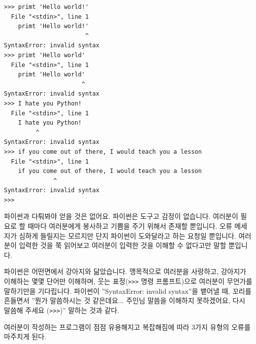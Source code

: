 \beforeverb
\begin{verbatim}
>>> primt 'Hello world!'
  File "<stdin>", line 1
    primt 'Hello world!'
                       ^
SyntaxError: invalid syntax
>>> primt 'Hello world'
  File "<stdin>", line 1
    primt 'Hello world'
                      ^
SyntaxError: invalid syntax
>>> I hate you Python!
  File "<stdin>", line 1
    I hate you Python!
         ^
SyntaxError: invalid syntax
>>> if you come out of there, I would teach you a lesson
  File "<stdin>", line 1
    if you come out of there, I would teach you a lesson
              ^
SyntaxError: invalid syntax
>>> 
\end{verbatim}
\afterverb
%

파이썬과 다퉈봐야 얻을 것은 없어요. 파이썬은 도구고 감정이 없습니다. 여러분이 필요로 할 때마다 여러분에게 봉사하고 기쁨을 주기 위해서 존재할 뿐입니다. 오류 메세지가 심하게 들릴지는 모르지만 단지 파이썬이 도와달라고 하는 요청일 뿐입니다. 여러분이 입력한 것을 쭉 읽어보고 여러분이 입력한 것을 이해할 수 없다고만 말할 뿐입니다.

파이썬은 어떤면에서 강아지와 닮았습니다. 맹목적으로 여러분을 사랑하고, 강아지가 이해하는 몇몇 단어만 이해하며, 웃는 표정({\tt >>>} 명령 프롬프트)으로 여러분이 무언가를 말하기만을 기다립니다. 파이썬이 ''SyntaxError: invalid syntax''을 뱉어낼 때, 꼬리를 흔들면서 ''뭔가 말씀하시는 것 같은데요... 주인님 말씀을 이해하지 못하겠어요, 다시 말씀해 주세요 ({\tt >>>})'' 말하는 것과 같다.

여러분이 작성하는 프로그램이 점점 유용해지고 복잡해짐에 따라 3가지 유형의 오류를 마주치게 된다.

